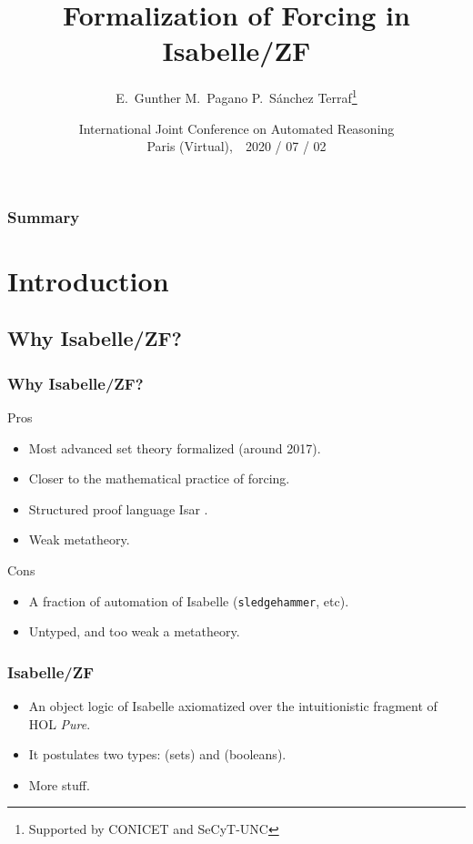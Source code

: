 \documentclass[english]{beamer}
\title[Forcing in Isabelle/ZF]{Formalization of Forcing in Isabelle/ZF}
\author[E.~Gunther, M.~Pagano, PST]{E.~Gunther \qquad M.~Pagano \qquad P.~Sánchez Terraf\thanks{Supported by
    CONICET and SeCyT-UNC} 
}
\institute[UNC]{CIEM-FaMAF --- Universidad Nacional de Córdoba}
\date[IJCAR 2020]{International Joint Conference on Automated
  Reasoning\\ Paris (Virtual),\ \  2020 / 07 / 02}
\begin{document}

\begin{frame}[plain]
  \titlepage
  \begin{center}
    \insertlogo
  \end{center}
\end{frame}
%
\begin{frame}
  \frametitle{Summary}
  \tableofcontents
  \transwipe
\end{frame}
%
\section{Introduction}

\subsection{Why Isabelle/ZF?}

\begin{frame}
  \frametitle{Why Isabelle/ZF?}
  \begin{block}{Pros}
    \begin{itemize}
    \item Most advanced set theory formalized (around 2017).
    \item Closer to the mathematical practice of forcing.
    \item Structured proof language Isar
      \citep{DBLP:conf/tphol/Wenzel99}.
    \item Weak metatheory.
    \end{itemize}
  \end{block}
  \pause
  \begin{block}{Cons}
    \begin{itemize}
    \item A fraction of automation of Isabelle (\texttt{sledgehammer},
      etc).
    \item Untyped, and too weak a metatheory.
    \end{itemize}
  \end{block}
\end{frame}

\begin{frame}
  \frametitle{Isabelle/ZF \citep{DBLP:journals/jar/PaulsonG96}}
  \begin{itemize}
  \item<+-> An object logic of Isabelle axiomatized over the
    intuitionistic fragment of HOL \emph{Pure}. 
  \item<+-> It postulates \alert<3->{two types}: 
    (sets) and  (booleans). 
    \pause
  \item<+-> More stuff.
  \end{itemize}
\end{frame}
\end{document}
